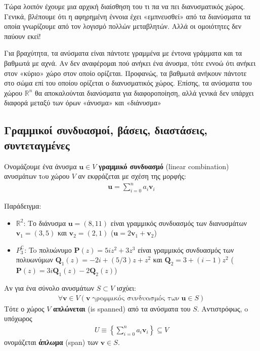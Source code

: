 \documentclass[main.tex]{subfiles}
\begin{document}
	Τώρα λοιπόν έχουμε μια αρχική διαίσθηση του τι πα να πει διανυσματικός χώρος. Γενικά, βλέπουμε ότι η αφηρημένη έννοια έχει «εμπνευσθεί» από τα διανύσματα τα οποία γνωρίζουμε από τον λογισμό πολλών μεταβλητών. Αλλά οι ομοιότητες δεν παύουν εκεί!
	
	\begin{remark}
		Για βραχύτητα, τα ανύσματα είναι πάντοτε γραμμένα με έντονα γράμματα και τα βαθμωτά με αχνά. Αν δεν αναφέρομαι πού ανήκει ένα άνυσμα, τότε εννοώ ότι ανήκει στον «κύριο» χώρο στον οποίο ορίζεται. Προφανώς, τα βαθμωτά ανήκουν πάντοτε στο σώμα επί του οποίου ορίζεται ο διανυσματικός χώρος. Επίσης, τα ανύσματα του χώρου $\mathbb{R}^n$ θα αποκαλούνται διανύσματα για διαφοροποίηση, αλλά γενικά δεν υπάρχει διαφορά μεταξύ των όρων «άνυσμα» και «διάνυσμα»
	\end{remark}
	
	\newpage
	\subsection{Γραμμικοί συνδυασμοί, βάσεις, διαστάσεις, συντεταγμένες}
	
	\begin{definition}
	Ονομάζουμε ένα άνυσμα ${\boldsymbol{u} \in V}$ \textbf{γραμμικό συνδυασμό} (linear combination) ανυσμάτων τoυ χώρου $V$ αν εκφράζεται με σχέση της μορφής:
		\begin{align*}
			\boldsymbol{u} = \sum^n_{i=0}a_i\boldsymbol{v}_i
		\end{align*}
	\end{definition}
	Παράδειγμα:
	\begin{itemize}
		\item $\mathbb{R}^2$: Το διάνυσμα $\boldsymbol{u} = (8, 11)$ είναι γραμμικός συνδυασμός των διανυσμάτων $\boldsymbol{v}_1 = (3, 5)$ και $\boldsymbol{v}_2 = (2, 1)$ ($\boldsymbol{u} = 2\boldsymbol{v}_1 + \boldsymbol{v}_2$)
		\item $P^\mathbb{C}_3$: To πολυώνυμο $\boldsymbol{P}(z) = 5iz^2 + 3z^3$ είναι γραμμικός συνδυασμός των πολυωνύμων $\boldsymbol{Q}_1(z) = -2i + (5/3)z + z^2$ και $\boldsymbol{Q}_2 = 3 + (i-1)z^2$ ($\boldsymbol{P}(z) = 3i\boldsymbol{Q}_1(z) - 2\boldsymbol{Q}_2(z)$)
	\end{itemize}

	\begin{definition}
		Αν για ένα σύνολο ανυσμάτων ${S \subset V}$ ισχύει:
		\begin{align*}
			\forall \boldsymbol{v} \in V(\boldsymbol{v} \; \text{γραμμικός συνδυασμός των} \; \boldsymbol{u}\in S)
		\end{align*}
		Τότε ο χώρος $V$ \textbf{απλώνεται} (is spanned) από τα ανύσματα του $S$. Αντιστρόφως, o υπόχωρος
		\begin{align*}
			U \equiv \left\{\sum^n_{i=0}a_i\boldsymbol{v}_i\right\} \subseteq V
		\end{align*}
		ονομάζεται \textbf{άπλωμα} (span) των $\boldsymbol{v} \in S$.
	\end{definition}
	
\end{document}
